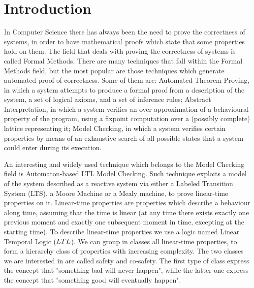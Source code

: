 
\chapter{Introduction} \label{chapt:introduction}

In Computer Science there has always been the need to prove the correctness of systems, in order to have mathematical proofs which state that some properties hold on them. 
The field that deals with proving the correctness of systems is called Formal Methods. 
There are many techniques that fall within the Formal Methods field, but the most popular are those techniques which generate automated proof of correctness. 
Some of them are: Automated Theorem Proving, in which a system attempts to produce a formal proof from a description of the system, a set of logical axioms, and a set of inference rules; Abstract Interpretation, in which a system verifies an over-approximation of a behavioural property of the program, using a fixpoint computation over a (possibly complete) lattice representing it; Model Checking, in which a system verifies certain properties by means of an exhaustive search of all possible states that a system could enter during its execution.

An interesting and widely used technique which belongs to the Model Checking field is Automaton-based LTL Model Checking.
Such technique exploits a model of the system described as a reactive system via either a Labeled Transition System (LTS), a Moore Machine or a Mealy machine, to prove linear-time properties on it.
Linear-time properties are properties which describe a behaviour along time, assuming that the time is linear (at any time there exists exactly one previous moment and exactly one subsequent moment in time, excepting at the starting time).
To describe linear-time properties we use a logic named Linear Temporal Logic ($LTL$).
We can group in classes all linear-time properties, to form a hierarchy class of properties with increasing complexity.
The two classes we are interested in are called safety and co-safety.
The first type of class express the concept that "something bad will never happen", while the latter one express the concept that "something good will eventually happen".

